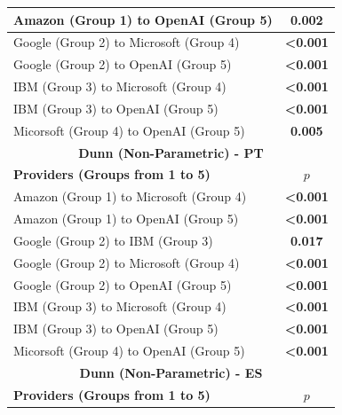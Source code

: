 \begin{table}[htb]
\begin{tabular}{|lcccc|}
\multicolumn{3}{|l|}{Amazon (Group 1) to OpenAI (Group 5)} & \multicolumn{2}{c|}{\textbf{0.002}} \\ \hline
\multicolumn{3}{|l|}{Google (Group 2) to Microsoft (Group 4)} & \multicolumn{2}{c|}{\textbf{\textless 0.001}} \\ \hline
\multicolumn{3}{|l|}{Google (Group 2) to OpenAI (Group 5)} & \multicolumn{2}{c|}{\textbf{\textless 0.001}} \\ \hline
\multicolumn{3}{|l|}{IBM (Group 3) to Microsoft (Group 4)} & \multicolumn{2}{c|}{\textbf{\textless 0.001}} \\ \hline
\multicolumn{3}{|l|}{IBM (Group 3) to OpenAI (Group 5)} & \multicolumn{2}{c|}{\textbf{\textless 0.001}} \\ \hline
\multicolumn{3}{|l|}{Micorsoft (Group 4) to OpenAI (Group 5)} & \multicolumn{2}{c|}{\textbf{0.005}} \\ \hline
\multicolumn{5}{|c|}{\textbf{Dunn (Non-Parametric) - PT}} \\ \hline
\multicolumn{3}{|l|}{\textbf{Providers (Groups from 1 to 5)}} & \multicolumn{2}{c|}{\textbf{\ensuremath{p}}} \\ \hline
\multicolumn{3}{|l|}{Amazon (Group 1) to Microsoft (Group 4)} & \multicolumn{2}{c|}{\textbf{\textless 0.001}} \\ \hline
\multicolumn{3}{|l|}{Amazon (Group 1) to OpenAI (Group 5)} & \multicolumn{2}{c|}{\textbf{\textless 0.001}} \\ \hline
\multicolumn{3}{|l|}{Google (Group 2) to IBM (Group 3)} & \multicolumn{2}{c|}{\textbf{0.017}} \\ \hline
\multicolumn{3}{|l|}{Google (Group 2) to Microsoft (Group 4)} & \multicolumn{2}{c|}{\textbf{\textless 0.001}} \\ \hline
\multicolumn{3}{|l|}{Google (Group 2) to OpenAI (Group 5)} & \multicolumn{2}{c|}{\textbf{\textless 0.001}} \\ \hline
\multicolumn{3}{|l|}{IBM (Group 3) to Microsoft (Group 4)} & \multicolumn{2}{c|}{\textbf{\textless 0.001}} \\ \hline
\multicolumn{3}{|l|}{IBM (Group 3) to OpenAI (Group 5)} & \multicolumn{2}{c|}{\textbf{\textless 0.001}} \\ \hline
\multicolumn{3}{|l|}{Micorsoft (Group 4) to OpenAI (Group 5)} & \multicolumn{2}{c|}{\textbf{\textless 0.001}} \\ \hline
\multicolumn{5}{|c|}{\textbf{Dunn (Non-Parametric) - ES}} \\ \hline
\multicolumn{3}{|l|}{\textbf{Providers (Groups from 1 to 5)}} & \multicolumn{2}{c|}{\textbf{\ensuremath{p}}} \\ \hline

\end{tabular}
\end{table}
